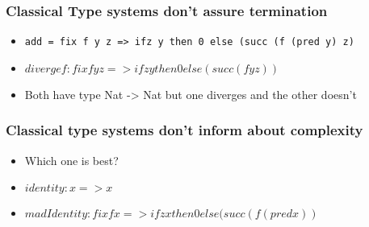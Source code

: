\documentclass{beamer}
\begin{document}
\begin{frame}
\frametitle{Classical Type systems don't assure termination}

\begin{itemize}
\item 
\begin{verbatim}
add = fix f y z => ifz y then 0 else (succ (f (pred y) z)
\end{verbatim}
\item $divergef : fix f y z => ifz y then 0 else (succ (f y z))$
\item Both have type Nat -> Nat but one diverges and the other doesn't
\end{itemize}
\end{frame}

\begin{frame}
\frametitle{Classical type systems don't inform about complexity}
\begin{itemize}
\item Which one is best? 
\item $identity : x => x$ 
\item $madIdentity: fix f x => ifz x then 0 else (succ (f (pred x))$
\end{itemize}
\end{frame}
\end{document}
